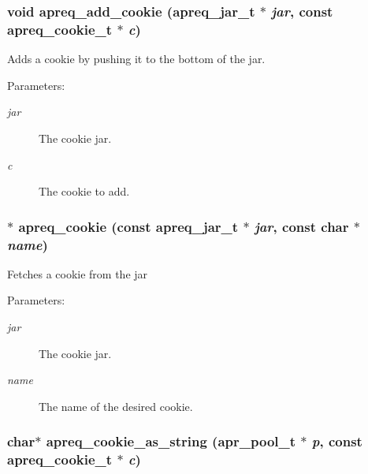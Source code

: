 \subsubsection{\setlength{\rightskip}{0pt plus 5cm}void apreq\_\-add\_\-cookie ({\bf apreq\_\-jar\_\-t} $\ast$ {\em jar}, const {\bf apreq\_\-cookie\_\-t} $\ast$ {\em c})}\label{group__cookies_a3}


Adds a cookie by pushing it to the bottom of the jar.

\begin{Desc}
\item[Parameters:]
\begin{description}
\item[{\em jar}]The cookie jar. \item[{\em c}]The cookie to add. \end{description}
\end{Desc}
\subsubsection{$\ast$ apreq\_\-cookie (const {\bf apreq\_\-jar\_\-t} $\ast$ {\em jar}, const char $\ast$ {\em name})}\label{group__cookies_a2}


Fetches a cookie from the jar

\begin{Desc}
\item[Parameters:]
\begin{description}
\item[{\em jar}]The cookie jar. \item[{\em name}]The name of the desired cookie. \end{description}
\end{Desc}
\subsubsection{\setlength{\rightskip}{0pt plus 5cm}char$\ast$ apreq\_\-cookie\_\-as\_\-string ({\bf apr\_\-pool\_\-t} $\ast$ {\em p}, const {\bf apreq\_\-cookie\_\-t} $\ast$ {\em c})}\label{group__cookies_a7}


